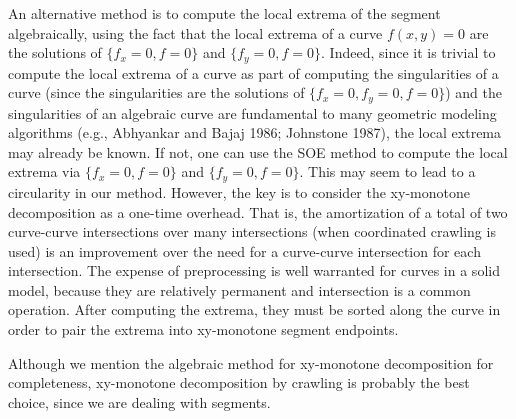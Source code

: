 An alternative method is to compute the local extrema of the segment algebraically,
using the fact that the local extrema of a curve $f(x,y)=0$ are the solutions of
\mbox{$\{f_{x}=0,f=0\}$} and \mbox{$\{f_{y}=0,f=0\}$}.
Indeed, since it is trivial to compute the local extrema of a curve as part of computing
the singularities of a curve (since the singularities are the solutions of 
\mbox{$\{f_{x}=0,f_{y}=0,f=0\}$}) and the singularities of an algebraic curve are fundamental to
many geometric modeling algorithms (e.g., Abhyankar and Bajaj 1986; Johnstone 1987),
the local extrema may already be known.
If not, one can use the SOE method to compute the local extrema via 
$\{f_{x}=0,f=0\}$ and $\{f_{y}=0,f=0\}$.
This may seem to lead to a circularity in our method.
However, the key is to consider the xy-monotone decomposition as a one-time overhead.
That is, the amortization of a total of two curve-curve intersections over many intersections 
(when coordinated crawling is used) is
an improvement over the need for a curve-curve intersection for each intersection.
The expense of preprocessing is well warranted for curves in a solid model,
because they are relatively permanent and intersection is a common operation.
After computing the extrema, they must be sorted along the curve in order to pair the extrema
into xy-monotone segment endpoints.
%

Although we mention the algebraic method for xy-monotone decomposition for completeness,
xy-monotone decomposition by crawling is probably the best choice, since we are dealing
with segments.

